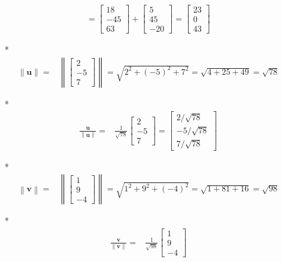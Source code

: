 \documentclass{article}
\begin{document}
\begin{itemize}
\begin{align*}
= \begin{bmatrix} 18 \\ -45 \\ 63 \end{bmatrix} + \begin{bmatrix} 5 \\ 45 \\ -20 \end{bmatrix} 
= \begin{bmatrix} 23 \\ 0 \\ 43 \end{bmatrix}  
\end{align*}
\item[*] \begin{align*}
\left\|\mathbf{u}\right\| = & \left\|\begin{bmatrix} 2 \\ -5 \\ 7 \end{bmatrix}\right\|  
= \sqrt{2^2 + (-5)^2 + 7^2} 
= \sqrt{4 + 25 + 49} 
= \sqrt{78}
\end{align*}
\item[*] \begin{align*}
\frac{\mathbf{u}}{\left\|\mathbf{u}\right\|} = & \frac{1}{\sqrt{78}}\begin{bmatrix} 2 \\ -5 \\ 7 \end{bmatrix}  
= \begin{bmatrix} 2/\sqrt{78} \\ -5/\sqrt{78} \\ 7/\sqrt{78} \end{bmatrix}
\end{align*}
\item[*] \begin{align*}
\left\|\mathbf{v}\right\| = & \left\|\begin{bmatrix} 1 \\ 9 \\ -4 \end{bmatrix}\right\|  
= \sqrt{1^2 + 9^2 + (-4)^2} 
= \sqrt{1 + 81 + 16} 
= \sqrt{98}
\end{align*}
\item[*] \begin{align*}
\frac{\mathbf{v}}{\left\|\mathbf{v}\right\|} = & \frac{1}{\sqrt{98}}\begin{bmatrix} 1 \\ 9 \\ -4 \end{bmatrix}  

\end{align*}
\end{itemize}
\end{document}
